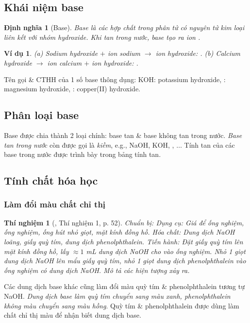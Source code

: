 \documentclass{article}
\newtheorem{dinhnghia}{Định nghĩa}
\newtheorem{thinghiem}{Thí nghiệm}
\newtheorem{vidu}{Ví dụ}
\begin{document}
\subsection{Khái niệm base}

\begin{dinhnghia}[Base]
	\emph{Base} là các hợp chất trong phân tử có nguyên tử kim loại liên kết với nhóm hydroxide. Khi tan trong nước, base tạo ra ion \emph{}.
\end{dinhnghia}

\begin{vidu}
	(a) Sodium hydroxide $+$ ion sodium $\to$ ion hydroxide: \emph{}. (b) Calcium hydroxide $\to$ ion calcium $+$ ion hydroxide: \emph{}.
\end{vidu}
Tên gọi \& CTHH của 1 số base thông dụng: KOH: potassium hydroxide, : magnesium hydroxide, : copper(II) hydroxide.

\subsection{Phân loại base}
Base được chia thành 2 loại chính: base tan \& base không tan trong nước. \textit{Base tan trong nước} còn được gọi là \textit{kiềm}, e.g., NaOH, KOH, , $\ldots$ Tính tan của các base trong nước được trình bày trong bảng tính tan.

\subsection{Tính chất hóa học}

\subsubsection{Làm đổi màu chất chỉ thị}

\begin{thinghiem}[\cite{SGK_KHTN_8_Canh_Dieu}, Thí nghiệm 1, p. 52]
	\emph{Chuẩn bị:} Dụng cụ: Giá để ống nghiệm, ống nghiệm, ống hút nhỏ giọt, mặt kính đồng hồ. Hóa chất: Dung dịch \emph{NaOH} loãng, giấy quỳ tím, dung dịch phenolphthalein. \emph{Tiến hành:} Đặt giấy quỳ tím lên mặt kính đồng hồ, lấy $\approx1$ \emph{mL} dung dịch \emph{NaOH} cho vào ống nghiệm. Nhỏ 1 giọt dung dịch \emph{NaOH} lên mẩu giấy quỳ tím, nhỏ 1 giọt dung dịch phenolphthalein vào ống nghiệm có dung dịch \emph{NaOH}. Mô tả các hiện tượng xảy ra.
\end{thinghiem}
Các dung dịch base khác cũng làm đổi màu quỳ tím \& phenolphthalein tương tự NaOH. \textit{Dung dịch base làm quỳ tím chuyển sang màu xanh, phenolphthalein không màu chuyển sang màu hồng}. Quỳ tím \& phenolphthalein được dùng làm chất chỉ thị màu để nhận biết dung dịch base.
\end{document}
